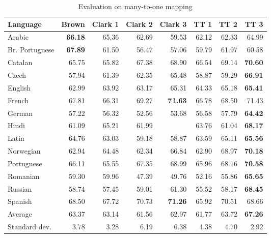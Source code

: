 \documentclass[11pt]{article}
\begin{document}
{\begin{table}
\scriptsize
\centering
\begin{tabular}{l|r|r|r|r|r|r|r}
\bf Language & \bf Brown & \bf Clark 1& \bf Clark 2 & \bf Clark 3 & \bf TT 1 & \bf TT 2 & \bf TT 3 \\
\hline
Arabic & \bf 66.18 & 65.36 & 62.69 & 59.53 & 62.12 & 62.33 & 64.99 \\
Br. Portuguese & \bf 67.89 & 61.50 & 56.47 & 57.06 & 59.79 & 61.97 & 60.58 \\
Catalan & 65.75 & 65.82 & 67.38 & 68.90 & 66.54 & 69.14 & \bf 70.60 \\
Czech & 57.94 & 61.39 & 62.35 & 65.48 & 58.87 & 59.29 & \bf 66.91 \\
English & 62.99 & 63.92 & 63.17 & 65.31 & 64.33 & 65.18 & \bf 65.41 \\
French & 67.81 & 66.31 & 69.27 & \bf 71.63 & 66.78 & 68.50 & 71.43 \\
German & 57.22 & 56.32 & 52.56 & 53.68 & 56.58 & 57.79 & \bf 64.42 \\
Hindi & 61.09 & 65.21 & 61.99 & & 63.76 & 61.04 & \bf 68.17 \\
Latin & 64.76 & 63.03 & 59.18 & 58.87 & 63.59 & 65.11 & \bf 65.56 \\
Norwegian & 62.94 & 64.48 & 62.34 & 66.84 & 62.90 & 68.97 & \bf 70.18 \\
Portuguese & 66.11 & 65.55 & 67.35 & 68.99 & 65.96 & 68.16 & \bf 70.58 \\
Romanian & 59.30 & 59.96 & 47.39 & 49.76 & 52.16 & 55.86 & \bf 65.65 \\
Russian & 58.74 & 57.45 & 59.01 & 61.30 & 55.52 & 58.17 & \bf 68.45 \\
Spanish & 68.50 & 67.72 & 70.73 & \bf 71.26 & 65.92 & 70.51 & 68.66 \\
\hline
Average & 63.37 & 63.14 & 61.56 & 62.97 & 61.77 & 63.72 & \bf 67.26 \\
Standard dev. & 3.78 & 3.28 & 6.19 & 6.38 & 4.38 & 4.70 & 2.92 \\
\end{tabular}
\caption{Evaluation on many-to-one mapping} \label{many-to-one}
\end{table}

}
\end{document}

